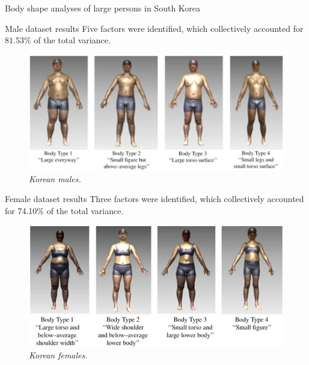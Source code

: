 \documentclass[10pt]{beamer}
\begin{document}
\begin{frame}{Body shape analyses of large persons in South Korea}
	\begin{minipage}{0.45\textwidth}
		\centering
		\begin{block}{Male dataset results}
			Five factors were identified, which collectively accounted for $81.53\%$ of the total variance.
		\end{block}
		\begin{figure}[H]
			\centering
			\caption{\footnotesize\centering\itshape Korean males.}
			\includegraphics[width=\textwidth]{../Images/Park1}
		\end{figure}
	\end{minipage}\hfill
	\begin{minipage}{0.45\textwidth}
		\centering
		\begin{block}{Female dataset results}
			Three factors were identified, which collectively accounted for 74.10\% of the total variance.
		\end{block}
		\begin{figure}[H]
			\centering
			\caption{\footnotesize\centering\itshape Korean females.}
			\includegraphics[width=\textwidth]{../Images/Park2}
		\end{figure}
	\end{minipage}
\end{frame}
\end{document}
